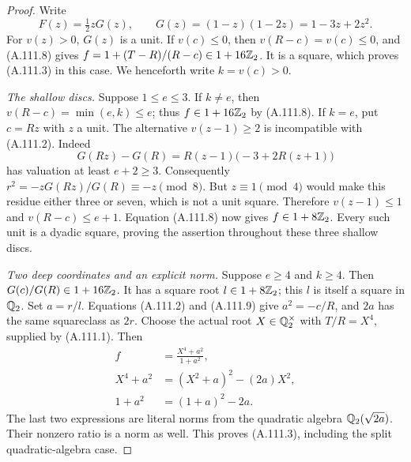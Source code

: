 \begin{proof}
Write
\[
       F(z)=\tfrac12 zG(z),\qquad
                      G(z)=(1-z)(1-2z)=1-3z+2z^2.
\tag{A.111.9}
\]
For $v(z)>0$, $G(z)$ is a unit.
If $v(c)\le0$, then $v(R-c)=v(c)\le0$,
and (A.111.8) gives
$f=1+(T-R)/(R-c)\in1+16\mathbb Z_2$.
It is a square, which proves (A.111.3) in this case.
We henceforth write $k=v(c)>0$.

\emph{The shallow discs.}
Suppose $1\le e\le3$.
If $k\ne e$, then $v(R-c)=\min(e,k)\le e$;
thus $f\in1+16\mathbb Z_2$ by (A.111.8).
If $k=e$, put $c=Rz$ with $z$ a unit.
The alternative $v(z-1)\ge2$ is incompatible
with (A.111.2).
Indeed
\[
 G(Rz)-G(R)=R(z-1)\bigl(-3+2R(z+1)\bigr)
\tag{A.111.10}
\]
has valuation at least $e+2\ge3$.
Consequently
$r^2=-zG(Rz)/G(R)\equiv-z\pmod8$.
But $z\equiv1\pmod4$ would make this residue
either three or seven, which is not a unit square.
Therefore $v(z-1)\le1$ and
$v(R-c)\le e+1$.
Equation (A.111.8) now gives $f\in1+8\mathbb Z_2$.
Every such unit is a dyadic square, proving the
assertion throughout these three shallow discs.

\emph{Two deep coordinates and an explicit norm.}
Suppose $e\ge4$ and $k\ge4$.
Then $G(c)/G(R)\in1+16\mathbb Z_2$.
It has a square root $l\in1+8\mathbb Z_2$; this $l$
is itself a square in $\mathbb Q_2$.
Set $a=r/l$.  Equations (A.111.2) and (A.111.9)
give $a^2=-c/R$, and $2a$ has the same squareclass
as $2r$.
Choose the actual root $X\in\mathbb Q_2^\times$ with
$T/R=X^4$, supplied by (A.111.1).
Then
\[
 \begin{split}
 f&=\frac{X^4+a^2}{1+a^2},\\
 X^4+a^2&=(X^2+a)^2-(2a)X^2,\\
 1+a^2&=(1+a)^2-2a.
 \end{split}
\tag{A.111.11}
\]
The last two expressions are literal norms from
the quadratic algebra $\mathbb Q_2(\sqrt{2a})$.
Their nonzero ratio is a norm as well.
This proves (A.111.3), including the split
quadratic-algebra case.


\end{proof}
